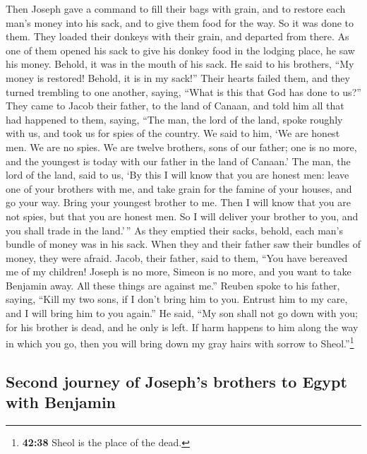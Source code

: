  Then Joseph gave a command to fill their bags with
grain, and to restore each man's money into his sack, and to give them
food for the way. So it was done to them.  They loaded
their donkeys with their grain, and departed from there. 
As one of them opened his sack to give his donkey food in the lodging
place, he saw his money. Behold, it was in the mouth of his sack.
 He said to his brothers, ``My money is restored! Behold,
it is in my sack!'' Their hearts failed them, and they turned trembling
to one another, saying, ``What is this that God has done to us?''
 They came to Jacob their father, to the land of Canaan,
and told him all that had happened to them, saying, 
``The man, the lord of the land, spoke roughly with us, and took us for
spies of the country.  We said to him, `We are honest
men. We are no spies.  We are twelve brothers, sons of
our father; one is no more, and the youngest is today with our father in
the land of Canaan.'  The man, the lord of the land, said
to us, `By this I will know that you are honest men: leave one of your
brothers with me, and take grain for the famine of your houses, and go
your way.  Bring your youngest brother to me. Then I will
know that you are not spies, but that you are honest men. So I will
deliver your brother to you, and you shall trade in the land.'\,''
 As they emptied their sacks, behold, each man's bundle
of money was in his sack. When they and their father saw their bundles
of money, they were afraid.  Jacob, their father, said to
them, ``You have bereaved me of my children! Joseph is no more, Simeon
is no more, and you want to take Benjamin away. All these things are
against me.''  Reuben spoke to his father, saying, ``Kill
my two sons, if I don't bring him to you. Entrust him to my care, and I
will bring him to you again.''  He said, ``My son shall
not go down with you; for his brother is dead, and he only is left. If
harm happens to him along the way in which you go, then you will bring
down my gray hairs with sorrow to Sheol.''\footnote{\textbf{42:38} Sheol
  is the place of the dead.}

\hypertarget{second-journey-of-josephs-brothers-to-egypt-with-benjamin}{%
\subsection{Second journey of Joseph's brothers to Egypt with
Benjamin}\label{second-journey-of-josephs-brothers-to-egypt-with-benjamin}}

